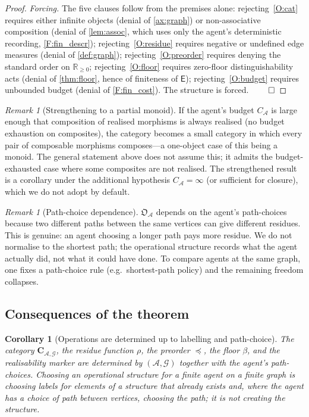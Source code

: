 \documentclass[11pt,a4paper]{article}
\theoremstyle{thmstyle}
\newtheorem{corollary}[theorem]{Corollary}
\theoremstyle{definition}
\theoremstyle{remark}
\newtheorem{remark}[theorem]{Remark}
\newcommand{\R}{\mathbb{R}}
\newcommand{\Graph}{\mathcal{G}}
\newcommand{\Edg}{\mathsf{E}}
\newcommand{\Agent}{\mathcal{A}}
\newcommand{\Res}{\rho}
\newcommand{\floor}{\beta}
\newcommand{\OpStr}{\mathfrak{O}}
\begin{document}
\begin{proof}
\emph{Forcing.} The five clauses follow from the premises alone:
rejecting~\ref{O:cat} requires either infinite objects (denial of
\cref{ax:graph}) or non-associative composition (denial of
\cref{lem:assoc}, which uses only the agent's deterministic
recording, \cref{F:fin_descr});
rejecting~\ref{O:residue} requires negative or undefined edge
measures (denial of \cref{def:graph});
rejecting~\ref{O:preorder} requires denying the standard order on
$\R_{\geq 0}$;
rejecting~\ref{O:floor} requires zero-floor distinguishability acts
(denial of \cref{thm:floor}, hence of finiteness of $\Edg$);
rejecting~\ref{O:budget} requires unbounded budget (denial of
\cref{F:fin_cost}). The structure is forced. $\qed$
\end{proof}

\begin{remark}[Strengthening to a partial monoid]
\label{rem:partial_monoid}
If the agent's budget $C_\Agent$ is large enough that composition
of realised morphisms is always realised (no budget exhaustion on
composites), the category becomes a small category in which every
pair of composable morphisms composes---a one-object case of this
being a monoid. The general statement above does not assume this;
it admits the budget-exhausted case where some composites are not
realised. The strengthened result is a corollary under the
additional hypothesis $C_\Agent = \infty$ (or sufficient for
closure), which we do not adopt by default.
\end{remark}

\begin{remark}[Path-choice dependence]
\label{rem:path_choice}
$\OpStr_\Agent$ depends on the agent's path-choices because two
different paths between the same vertices can give different
residues. This is genuine: an agent choosing a longer path pays
more residue. We do not normalise to the shortest path; the
operational structure records what the agent actually did, not
what it could have done. To compare agents at the same graph, one
fixes a path-choice rule (e.g.~shortest-path policy) and the
remaining freedom collapses.
\end{remark}

\subsection{Consequences of the theorem}

\begin{corollary}[Operations are determined up to labelling and
path-choice]
\label{cor:not_chosen}
The category $\mathbf{C}_{\Agent,\Graph}$, the residue function
$\Res$, the preorder $\preceq$, the floor $\floor$, and the
realisability marker are determined by $(\Agent, \Graph)$ together
with the agent's path-choices. Choosing an operational structure
for a finite agent on a finite graph is choosing labels for
elements of a structure that already exists and, where the agent
has a choice of path between vertices, choosing the path; it is
not creating the structure.
\end{corollary}
\end{document}
